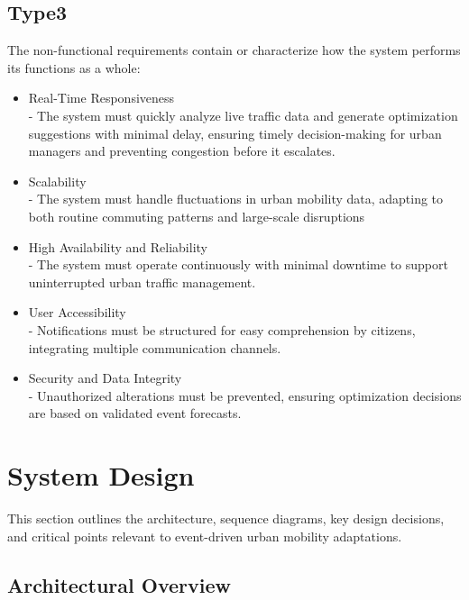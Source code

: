 \documentclass[a4paper,12pt]{article}
\begin{document}
\subsection*{Type3}
The non-functional requirements contain or characterize how the system performs its functions as a whole:
\begin{itemize}
    \item{Real-Time Responsiveness} 
    \\- The system must quickly analyze live traffic data and generate optimization suggestions with minimal delay, ensuring timely decision-making for urban managers and preventing congestion before it escalates.
    \item{Scalability} 
    \\- The system must handle fluctuations in urban mobility data, adapting to both routine commuting patterns and large-scale disruptions
    \item{High Availability and Reliability}
    \\- The system must operate continuously with minimal downtime to support uninterrupted urban traffic management.
    \item{User Accessibility} 
    \\- Notifications must be structured for easy comprehension by citizens, integrating multiple communication channels.
    \item{Security and Data Integrity} 
    \\- Unauthorized alterations must be prevented, ensuring optimization decisions are based on validated event forecasts.
\end{itemize}

\newpage

\section{System Design}
This section outlines the architecture, sequence diagrams, key design decisions, and critical points relevant to event-driven urban mobility adaptations.

\subsection{Architectural Overview}
\end{document}
